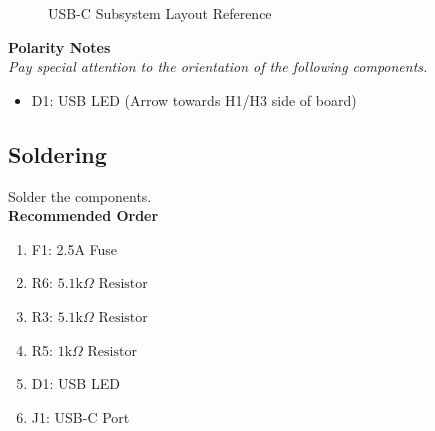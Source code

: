 \documentclass{article}
\newcommand{\resistor}[1]{$\text{#1} \Omega \text{ Resistor}$}
\begin{document}
\begin{figure}[H]
    \centering
        \qquad
        \caption{USB-C Subsystem Layout Reference}%
    \label{fig:usbc-layout}%
\end{figure}

\noindent \textbf{Polarity Notes}\\
\noindent \textit{Pay special attention to the orientation of the following components.}
\begin{itemize}
  \item D1: USB LED (Arrow towards H1/H3 side of board)
\end{itemize}

\subsection{Soldering}

Solder the components. \\

\noindent \textbf{Recommended Order}

\begin{enumerate}
  \item F1: 2.5A Fuse
  \item R6: \resistor{5.1k}
  \item R3: \resistor{5.1k}
  \item R5: \resistor{1k}
  \item D1: USB LED
  \item J1: USB-C Port
\end{enumerate}
\end{document}
